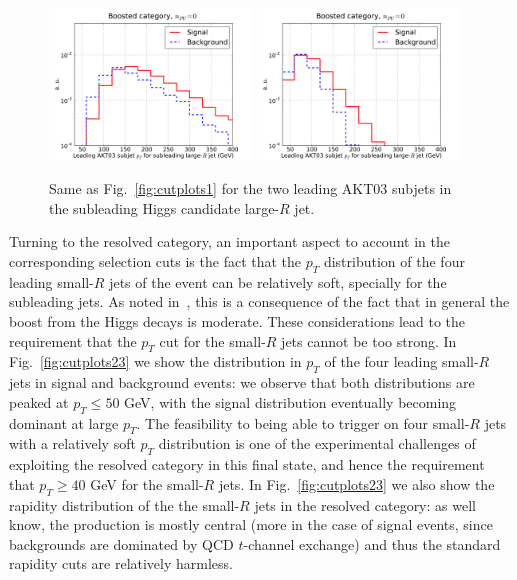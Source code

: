 \begin{figure}[t]
\begin{center}
 \includegraphics[width=0.48\textwidth]{plots/pt_leadSJ_fj2_noPU.pdf}
 \includegraphics[width=0.48\textwidth]{plots/pt_subleadSJ_fj2_noPU.pdf}
 \caption{\small  Same as Fig.~\ref{fig:cutplots1} for the two leading AKT03
   subjets in the subleading Higgs candidate large-$R$ jet.
}
\label{fig:cutplots22}
\end{center}
\end{figure}


Turning to the resolved category, an important aspect to account
in the corresponding selection
cuts is the fact that the $p_T$ distribution
of the four leading small-$R$ jets of the event can be relatively soft,
specially for the subleading jets.
%
As noted in~\cite{deLima:2014dta}, this is a consequence of the fact
that in general the boost from the Higgs decays is moderate.
%
These considerations lead to the requirement that the $p_T$ cut
for the small-$R$ jets cannot be too strong.
%
In Fig.~\ref{fig:cutplots23}
we show the distribution in $p_T$ of the four leading
small-$R$ jets in signal and background events: we observe that both
distributions are peaked at $p_T \le 50$ GeV, with the signal distribution
eventually becoming dominant at large $p_T$.
%
The feasibility to being able to trigger on four small-$R$ jets with a relatively
soft $p_T$ distribution is one of the experimental challenges of
exploiting the resolved category in this final state,
and hence the requirement that $p_T \ge 40$ GeV for
the small-$R$ jets.
%
In  Fig.~\ref{fig:cutplots23} we also show the
rapidity distribution of the the small-$R$
jets in the resolved category: as well know, the production
is mostly central (more in the case
of signal events, since backgrounds are dominated by
QCD $t$-channel exchange) and thus the standard rapidity cuts
are relatively harmless.



